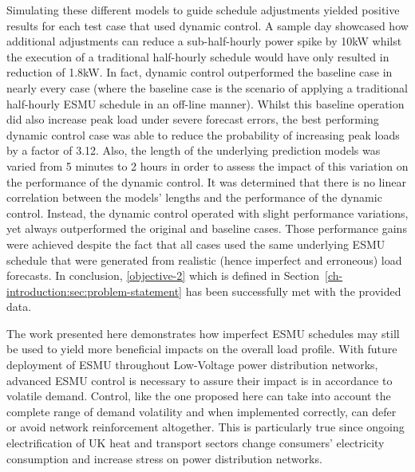 Simulating these different models to guide schedule adjustments yielded positive results for each test case that used dynamic control.
A sample day showcased how additional adjustments can reduce a sub-half-hourly power spike by 10kW whilst the execution of a traditional half-hourly schedule would have only resulted in reduction of 1.8kW.
In fact, dynamic control outperformed the baseline case in nearly every case (where the baseline case is the scenario of applying a traditional half-hourly ESMU schedule in an off-line manner).
Whilst this baseline operation did also increase peak load under severe forecast errors, the best performing dynamic control case was able to reduce the probability of increasing peak loads by a factor of 3.12.
Also, the length of the underlying prediction models was varied from 5 minutes to 2 hours in order to assess the impact of this variation on the performance of the dynamic control.
It was determined that there is no linear correlation between the models' lengths and the performance of the dynamic control.
Instead, the dynamic control operated with slight performance variations, yet always outperformed the original and baseline cases.
Those performance gains were achieved despite the fact that all cases used the same underlying ESMU schedule that were generated from realistic (hence imperfect and erroneous) load forecasts.
In conclusion, \ref{objective-2} which is defined in Section~\ref{ch-introduction:sec:problem-statement} has been successfully met with the provided data.

The work presented here demonstrates how imperfect ESMU schedules may still be used to yield more beneficial impacts on the overall load profile.
With future deployment of ESMU throughout Low-Voltage power distribution networks, advanced ESMU control is necessary to assure their impact is in accordance to volatile demand.
Control, like the one proposed here can take into account the complete range of demand volatility and when implemented correctly, can defer or avoid network reinforcement altogether.
This is particularly true since ongoing electrification of UK heat and transport sectors change consumers' electricity consumption and increase stress on power distribution networks.
